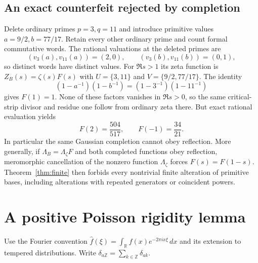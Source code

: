 \documentclass[11pt]{article}
\theoremstyle{remark}\newtheorem{remark}[theorem]{Remark}
\newcommand{\Z}{\mathbb Z}\newcommand{\N}{\mathbb N}
\newcommand{\R}{\mathbb R}\newcommand{\C}{\mathbb C}
\newcommand{\dd}{\,d}\newcommand{\comb}[1]{\delta_{#1}}
\begin{document}
\subsection{An exact counterfeit rejected by completion}
Delete ordinary primes $p=3,q=11$ and introduce primitive values
$a=9/2,b=77/17$. Retain every other ordinary prime and count formal
commutative words. The rational valuations at the deleted primes are
\[
 (v_3(a),v_{11}(a))=(2,0),\qquad
 (v_3(b),v_{11}(b))=(0,1),
\]
so distinct words have distinct values. For $\Re s>1$ its zeta function is
$Z_B(s)=\zeta(s)F(s)$ with $U=\{3,11\}$ and $V=\{9/2,77/17\}$.
The identity
\[
 (1-a^{-1})(1-b^{-1})=(1-3^{-1})(1-11^{-1})
\]
gives $F(1)=1$. None of these factors vanishes in $\Re s>0$, so the same
critical-strip divisor and residue one follow from ordinary zeta there.
But exact rational evaluation yields
\begin{equation}\label{eq:counterfeit}
 F(2)=\frac{504}{517},\qquad F(-1)=\frac{34}{21}.
\end{equation}
In particular the same Gaussian completion cannot obey reflection. More
generally, if $\Lambda_B=\Lambda_\zeta F$ and both completed functions
obey reflection, meromorphic cancellation of the nonzero function
$\Lambda_\zeta$ forces $F(s)=F(1-s)$. Theorem~\ref{thm:finite} then
forbids every nontrivial finite alteration of primitive bases, including
alterations with repeated generators or coincident powers.

\section{A positive Poisson rigidity lemma}
Use the Fourier convention
$\widehat f(\xi)=\int_\R f(x)e^{-2\pi i x\xi}\dd x$ and its
extension to tempered distributions. Write
$\comb{a\Z}=\sum_{k\in\Z}\delta_{ak}$.
\end{document}
